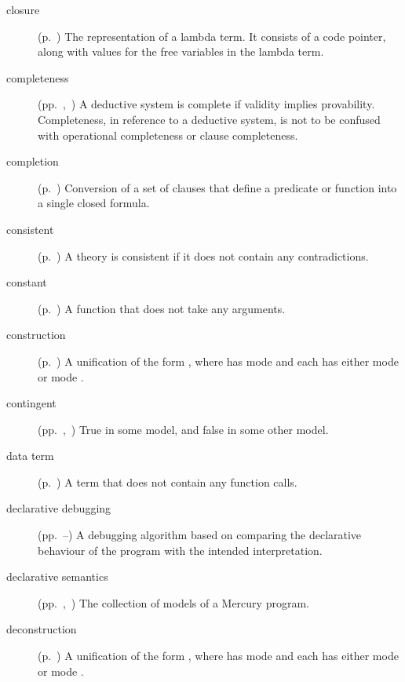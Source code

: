 \begin{description}
\item[closure]
(p.~\pageref{gi:closure})
The representation of a lambda term.
It consists of a code pointer,
along with values for the free variables
in the lambda term.

\item[completeness]
(pp.~\pageref{thm:completeness},~\pageref{gi:completeness2})
A deductive system is complete if validity implies provability.
Completeness, in reference to a deductive system,
is not to be confused with operational completeness or clause completeness.

\item[completion]
(p.~\pageref{sec:completion})
Conversion of a set of clauses that define a predicate or function
into a single closed formula.

\item[consistent]
(p.~\pageref{gi:consistent})
A theory is consistent if it does not contain any contradictions.

\item[constant]
(p.~\pageref{gi:constant})
A function that does not take any arguments.

\item[construction]
(p.~\pageref{gi:construction})
A unification of the form ,
where  has mode 
and each  has either mode 
or mode .

\item[contingent]
(pp.~\pageref{gi:contingent},~\pageref{gi:contingent2})
True in some model, and false in some other model.

\item[data term]
(p.~\pageref{gi:data-term})
A term that does not contain any function calls.

\item[declarative debugging]
(pp.~\pageref{sec:decl-debug}--\pageref{end:decl-debug})
A debugging algorithm based on
comparing the declarative behaviour of the program
with the intended interpretation.

\item[declarative semantics]
(pp.~\pageref{sec:by-example},~\pageref{def:declarative-semantics})
The collection of models of a Mercury program.

\item[deconstruction]
(p.~\pageref{gi:deconstruction})
A unification of the form ,
where  has mode 
and each  has either mode 
or mode .


\end{description}
